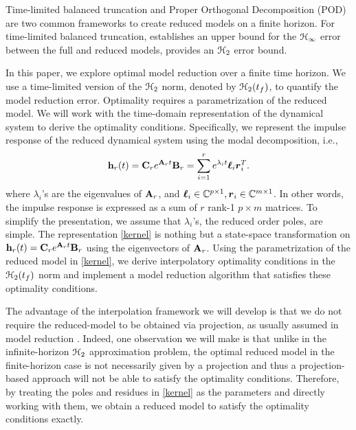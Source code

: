\documentclass[twocolumn]{autart}
\begin{document}
Time-limited balanced truncation \cite{GawJ90,GugA03,RedK17,Kur17} and Proper Orthogonal Decomposition (POD)   \cite{HolLB96}  are two common frameworks to create reduced models on a finite horizon. 
For time-limited balanced truncation, \cite{GugA03} establishes an upper bound for the $\EuScript{H}_\infty$ error between the full and reduced models,  \cite{RedK17} provides an $\EuScript{H}_2$ error bound. 

  
In this paper,  we explore optimal model reduction over a finite time horizon. We use a time-limited version of the $\EuScript{H}_2$ norm, denoted by $\EuScript{H}_2(t_f)$, to quantify the model reduction error.
 Optimality requires a parametrization of the reduced model. We will work with the time-domain representation of the dynamical system to derive the optimality conditions. Specifically, we represent the impulse response of the reduced dynamical system using the modal decomposition, i.e.,
 \begin{equation}\label{kernel}
\begin{aligned}
\mathbf{h}_r(t)=\mathbf{C}_r e^{\mathbf{A}_r t}\mathbf{B}_r=\sum_{i=1}^r e^{\lambda_it}\boldsymbol{\ell}_i\boldsymbol{r}_i^T.
\end{aligned}
\end{equation}
where $\lambda_i$'s are the eigenvalues of $\mathbf{A}_r$, and $\boldsymbol{\ell}_i \in \mathbb{C}^{p\times 1}, \boldsymbol{r}_i\in \mathbb{C}^{m\times1}$. 
In other words, the impulse response is expressed as a sum of $r$ rank-1 $p\times m$  matrices.
To simplify the presentation,  we assume  that $\lambda_i$'s, the reduced order poles,  are simple.  The representation \eqref{kernel} 
is nothing but a state-space transformation on $\mathbf{h}_r(t)=\mathbf{C}_r e^{\mathbf{A}_r t}\mathbf{B}_r$ using the eigenvectors of $\mathbf{A}_r$. 
Using the parametrization of the reduced model in \eqref{kernel}, we derive interpolatory optimality conditions in the $\EuScript{H}_2(t_f)$ norm and implement a model reduction algorithm that satisfies these optimality conditions.

The advantage of the interpolation framework we will develop  is that 
we do not require the reduced-model to be obtained via projection, as usually assumed in model reduction \cite{Ant05}. Indeed, one observation we will make is that unlike in the infinite-horizon $\EuScript{H}_2$ approximation problem, the optimal reduced model in the finite-horizon case is not necessarily given by a projection and thus a projection-based approach will not be able to satisfy the optimality conditions. Therefore,  
by treating the poles and residues in \eqref{kernel} as the parameters and directly working with them, we  obtain a reduced model to satisfy the optimality conditions exactly.
\end{document}
